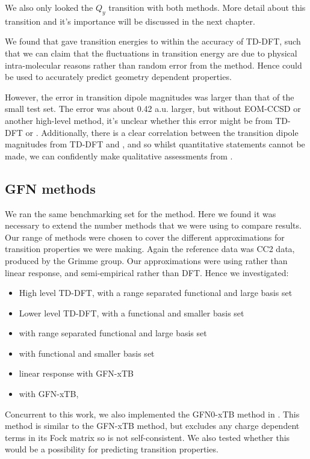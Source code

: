 We also only looked the $Q_y$ transition with both methods. More detail about this
transition and it's importance will be discussed in the next chapter.

We found that \dscf gave transition energies to within the accuracy of TD-DFT, 
such that we can claim that the fluctuations in transition energy are due to
physical intra-molecular reasons rather than random error from the \dscf method.
Hence \dscf could be used to accurately predict geometry dependent properties.

However, the error in transition dipole magnitudes was larger than that of the small
test set. The error was about 0.42 a.u. larger, but without EOM-CCSD or another
high-level method, it's unclear whether this error might be from TD-DFT or \dscf.
Additionally, there is a clear correlation between the transition dipole magnitudes
from TD-DFT and \dscf, and so whilst quantitative statements cannot be made, we 
can confidently make qualitative assessments from \dscf.


\subsection{GFN methods}
\label{subsec:dscf_gfn_tests}
We ran the same benchmarking set for the \dxtb method. Here we found it was 
necessary to extend the number methods that we were using to compare results.
Our range of methods were chosen to cover the different approximations for
transition properties we were making. Again the reference data was CC2 data, 
produced by the Grimme group. Our approximations were using \dscf rather than
linear response, and semi-empirical rather than DFT. Hence we investigated:
\begin{itemize}
    \item High level TD-DFT, with a range separated functional and large basis set
    \item Lower level TD-DFT, with a functional and smaller basis set
    \item \dscf with range separated functional and large basis set
    \item \dscf with functional and smaller basis set
    \item linear response with GFN-xTB
    \item \dscf with GFN-xTB, \dxtb
\end{itemize}

Concurrent to this work, we also implemented the GFN0-xTB method in .
This method is similar to the GFN-xTB method, but excludes any charge dependent
terms in its Fock matrix so is not self-consistent. We also tested whether this
would be a possibility for predicting transition properties.

